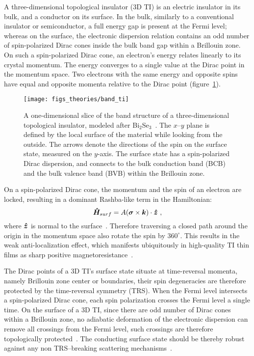 A three-dimensional topological insulator (3D TI) is an electric insulator in its bulk, and a conductor on its surface. In the bulk, similarly to a conventional insulator or semiconductor, a full energy gap is present at the Fermi level; whereas on the surface, the electronic dispersion relation contains an odd number of spin-polarized Dirac cones inside the bulk band gap within a Brillouin zone. On such a spin-polarized Dirac cone, an electron's energy relates linearly to its crystal momentum. The energy converges to a single value at the Dirac point in the momentum space. Two electrons with the same energy and opposite spins have equal and opposite momenta relative to the Dirac point (figure~\ref{fig:intro_ti}).%
\begin{figure}[ht]%
    \centering%
    \texttt{[image: figs\_theories/band\_ti]}%
    \caption[Band structure of a 3D topological insulator]{\label{fig:intro_ti}A one-dimensional slice of the band structure of a three-dimensional topological insulator, modeled after Bi$_2$Se$_3$~\cite{TI_electronic_structure_zhang}. The $x$--$y$ plane is defined by the local surface of the material while looking from the outside. The arrows denote the directions of the spin on the surface state, measured on the $y$-axis. The surface state has a spin-polarized Dirac dispersion, and connects to the bulk conduction band (BCB) and the bulk valence band (BVB) within the Brillouin zone.}%
\end{figure}%

On a spin-polarized Dirac cone, the momentum and the spin of an electron are locked, resulting in a dominant Rashba-like term in the Hamiltonian:%
\begin{equation}%
    \op{H}_{surf} = A (\vec{\sigma} \times \vec{k}) \cdot \vu*{z}~,\label{eq:surf_Rashba}%
\end{equation}%
where $\vu*{z}$ is normal to the surface~\cite{TI_Qi, TI_electronic_structure_zhang, Liu2010}. Therefore traversing a closed path around the origin in the momentum space also rotate the spin by $360^\circ$. This results in the weak anti-localization effect, which manifests ubiquitously in high-quality TI thin films as sharp positive magnetoresistance~\cite{TI_WAL_Hongkong, TI_WAL_thickness, zhangli2012, zhangli2013}.

The Dirac points of a 3D TI's surface state situate at time-reversal momenta, namely Brillouin zone center or boundaries, their spin degeneracies are therefore protected by the time-reversal symmetry (TRS). When the Fermi level intersects a spin-polarized Dirac cone, each spin polarization crosses the Fermi level a single time. On the surface of a 3D TI, since there are odd number of Dirac cones within a Brillouin zone, no adiabatic deformation of the electronic dispersion can remove all crossings from the Fermi level, such crossings are therefore topologically protected~\cite{Kane2005}. The conducting surface state should be thereby robust against any non TRS--breaking scattering mechanisms~\cite{TI_Qi, TI_Col}.

